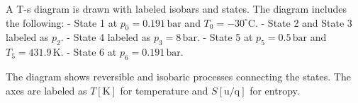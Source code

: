 A T-s diagram is drawn with labeled isobars and states. The diagram includes the following:  
- State 1 at \( p_0 = 0.191 \, \text{bar} \) and \( T_0 = -30^\circ \text{C} \).  
- State 2 and State 3 labeled as \( p_2 \).  
- State 4 labeled as \( p_3 = 8 \, \text{bar} \).  
- State 5 at \( p_5 = 0.5 \, \text{bar} \) and \( T_5 = 431.9 \, \text{K} \).  
- State 6 at \( p_6 = 0.191 \, \text{bar} \).  

The diagram shows reversible and isobaric processes connecting the states. The axes are labeled as \( T [\text{K}] \) for temperature and \( S [\text{u/q}] \) for entropy.